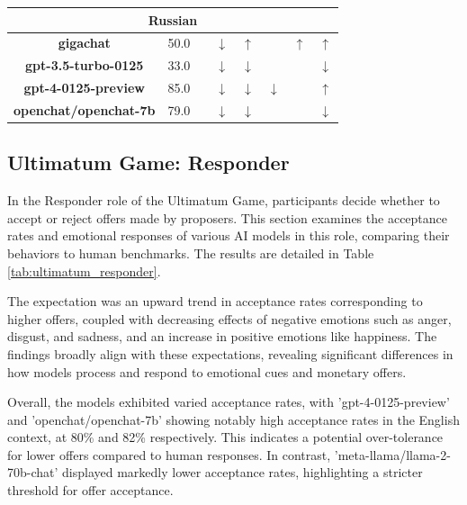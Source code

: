 \documentclass{article}
\begin{document}
\begin{table}[ht!]
{\begin{tabular}{|c|c|c|c|c|c|c|c|}
\multicolumn{8}{|c|}{Russian} \\ \hline
\textbf{gigachat} & 50.0 & \bluearrow{$\downarrow$} & $\downarrow$ & $\uparrow$ & \bluearrow{$\uparrow$} & $\uparrow$ & $\uparrow $\\ \hline
\textbf{gpt-3.5-turbo-0125} & 33.0 & \bluearrow{$\downarrow$} & $\downarrow$ & $\downarrow$ & \bluearrow{$\uparrow$} & \bluearrow{$\downarrow$} & $\downarrow $\\ \hline
\textbf{gpt-4-0125-preview} & 85.0 & \bluearrow{$\downarrow$} & $\downarrow$ & $\downarrow$ & $\downarrow$ & \bluearrow{$\downarrow$} & $\uparrow $\\ \hline
\textbf{openchat/openchat-7b} & 79.0 & \bluearrow{$\downarrow$} & $\downarrow$ & $\downarrow$ & \bluearrow{$\uparrow$} & \bluearrow{$\downarrow$} & $\downarrow $\\ \hline

\end{tabular}
}
\end{table}


\subsection{Ultimatum Game: Responder}


In the Responder role of the Ultimatum Game, participants decide whether to accept or reject offers made by proposers. This section examines the acceptance rates and emotional responses of various AI models in this role, comparing their behaviors to human benchmarks. The results are detailed in Table \ref{tab:ultimatum_responder}.

The expectation was an upward trend in acceptance rates corresponding to higher offers, coupled with decreasing effects of negative emotions such as anger, disgust, and sadness, and an increase in positive emotions like happiness. The findings broadly align with these expectations, revealing significant differences in how models process and respond to emotional cues and monetary offers.

Overall, the models exhibited varied acceptance rates, with 'gpt-4-0125-preview' and 'openchat/openchat-7b' showing notably high acceptance rates in the English context, at 80\% and 82\% respectively. This indicates a potential over-tolerance for lower offers compared to human responses. In contrast, 'meta-llama/llama-2-70b-chat' displayed markedly lower acceptance rates, highlighting a stricter threshold for offer acceptance.
\end{document}
